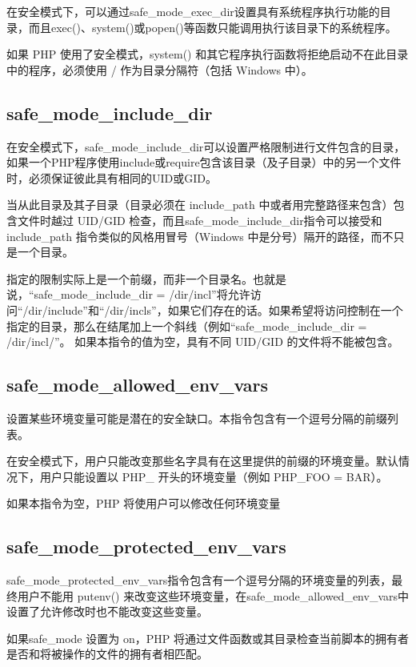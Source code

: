 在安全模式下，可以通过safe\_mode\_exec\_dir设置具有系统程序执行功能的目录，而且exec()、system()或popen()等函数只能调用执行该目录下的系统程序。

如果 PHP 使用了安全模式，system() 和其它程序执行函数将拒绝启动不在此目录中的程序，必须使用 / 作为目录分隔符（包括 Windows 中）。

\subsection{safe\_mode\_include\_dir}


在安全模式下，safe\_mode\_include\_dir可以设置严格限制进行文件包含的目录，如果一个PHP程序使用include或require包含该目录（及子目录）中的另一个文件时，必须保证彼此具有相同的UID或GID。

当从此目录及其子目录（目录必须在 include\_path 中或者用完整路径来包含）包含文件时越过 UID/GID 检查，而且safe\_mode\_include\_dir指令可以接受和 include\_path 指令类似的风格用冒号（Windows 中是分号）隔开的路径，而不只是一个目录。

指定的限制实际上是一个前缀，而非一个目录名。也就是说，“safe\_mode\_include\_dir = /dir/incl”将允许访问“/dir/include”和“/dir/incls”，如果它们存在的话。如果希望将访问控制在一个指定的目录，那么在结尾加上一个斜线（例如“safe\_mode\_include\_dir = /dir/incl/”。 如果本指令的值为空，具有不同 UID/GID 的文件将不能被包含。

\subsection{safe\_mode\_allowed\_env\_vars}

设置某些环境变量可能是潜在的安全缺口。本指令包含有一个逗号分隔的前缀列表。

在安全模式下，用户只能改变那些名字具有在这里提供的前缀的环境变量。默认情况下，用户只能设置以 PHP\_ 开头的环境变量（例如 PHP\_FOO = BAR）。

如果本指令为空，PHP 将使用户可以修改任何环境变量

\subsection{safe\_mode\_protected\_env\_vars}

safe\_mode\_protected\_env\_vars指令包含有一个逗号分隔的环境变量的列表，最终用户不能用 putenv() 来改变这些环境变量，在safe\_mode\_allowed\_env\_vars中设置了允许修改时也不能改变这些变量。

如果safe\_mode 设置为 on，PHP 将通过文件函数或其目录检查当前脚本的拥有者是否和将被操作的文件的拥有者相匹配。

